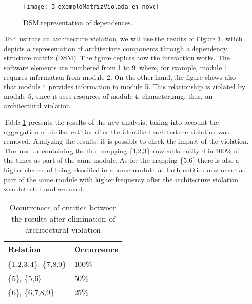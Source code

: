  \begin{figure}[!h]
 	\centering
 	\texttt{[image: 3\_exemploMatrizViolada\_en\_novo]}
 	\caption{DSM representation	of dependences.}
 	\label{3_exemploMatrizViolada}
 \end{figure}

To illustrate an architecture violation, we will use the results of Figure \ref{3_exemploMatrizViolada}, which depicts a representation of architecture components through a dependency structure matrix (DSM). The figure depicts how the interaction works. The software elements are numbered from 1 to 9, where, for example, module 1 requires information from module 2. On the other hand, the figure shows also that module 4 provides information to module 5. This relationship is violated by module 5, since it uses resources of module 4, characterizing, thus, an architectural violation. %

 Table \ref{ocorrencias_2} presents the results of the new analysis, taking into account the aggregation of similar entities after the identified architecture violation was removed. Analyzing the results, it is possible to check the impact of the violation. The module containing the first mapping \{1,2,3\} now adds entity 4 in 100\% of the times as part of the same module. As for the mapping \{5,6\} there is also a higher chance of being classified in a same module, as both entities now occur as part of the same module with higher frequency after the architecture violation was detected and removed.


\begin{table}[h]
	\centering
	\caption{Occurrences of entities between the results after elimination of architectural violation}
	\label{ocorrencias_2}
	\begin{tabular}{|ll|}
		\hline
		\multicolumn{1}{|l}{Relation} & \multicolumn{1}{l|}{Occurrence} \\ \hline
		\{1,2,3,4\}, \{7,8,9\}  	 & 100\%                           \\ \hline
		\{5\}, \{5,6\}	& 50\%                            \\ \hline
		\{6\}, \{6,7,8,9\}	& 25\%                            \\ 
		\hline
	\end{tabular}
\end{table}

